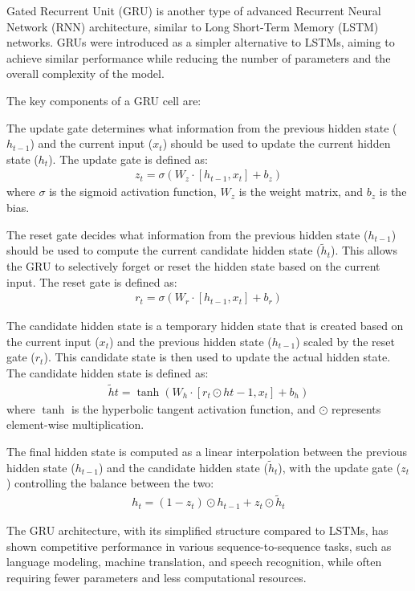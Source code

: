 \documentclass{ieeeojies}
\begin{document}
Gated Recurrent Unit (GRU) is another type of advanced Recurrent Neural Network (RNN) architecture, similar to Long Short-Term Memory (LSTM) networks. GRUs were introduced as a simpler alternative to LSTMs, aiming to achieve similar performance while reducing the number of parameters and the overall complexity of the model.

The key components of a GRU cell are:

The update gate determines what information from the previous hidden state ($h_{t-1}$) and the current input ($x_t$) should be used to update the current hidden state ($h_t$). The update gate is defined as:
$$
\begin{aligned}
	z_t = \sigma(W_z \cdot [h_{t-1}, x_t] + b_z)
\end{aligned}
$$
where $\sigma$ is the sigmoid activation function, $W_z$ is the weight matrix, and $b_z$ is the bias.

The reset gate decides what information from the previous hidden state ($h_{t-1}$) should be used to compute the current candidate hidden state ($\tilde{h}_t$). This allows the GRU to selectively forget or reset the hidden state based on the current input. The reset gate is defined as:
$$
\begin{aligned}
	r_t = \sigma(W_r \cdot [h_{t-1}, x_t] + b_r)
\end{aligned}
$$

The candidate hidden state is a temporary hidden state that is created based on the current input ($x_t$) and the previous hidden state ($h_{t-1}$) scaled by the reset gate ($r_t$). This candidate state is then used to update the actual hidden state. The candidate hidden state is defined as:
$$
\begin{aligned}
	\tilde{h}t = \tanh(W_h \cdot [r_t \odot h{t-1}, x_t] + b_h)
\end{aligned}
$$
where $\tanh$ is the hyperbolic tangent activation function, and $\odot$ represents element-wise multiplication.

The final hidden state is computed as a linear interpolation between the previous hidden state ($h_{t-1}$) and the candidate hidden state ($\tilde{h}_t$), with the update gate ($z_t$) controlling the balance between the two:
$$
\begin{aligned}
	h_t = (1 - z_t) \odot h_{t-1} + z_t \odot \tilde{h}_t
\end{aligned}
$$

The GRU architecture, with its simplified structure compared to LSTMs, has shown competitive performance in various sequence-to-sequence tasks, such as language modeling, machine translation, and speech recognition, while often requiring fewer parameters and less computational resources.
\end{document}
